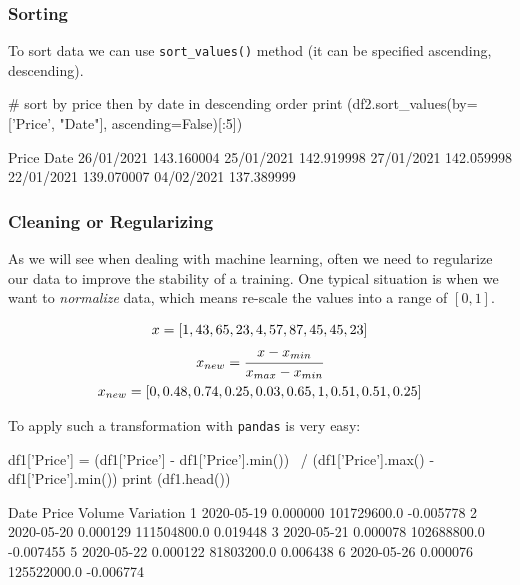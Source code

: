 \subsubsection{Sorting}\label{sorting}

To sort data we can use \texttt{sort\_values()} method (it can be specified ascending, descending).

\begin{ipythonnon}
# sort by price then by date in descending order
print (df2.sort_values(by=['Price', "Date"], ascending=False)[:5])
\end{ipythonnon}
\begin{ioutput}
                 Price
Date                  
26/01/2021  143.160004
25/01/2021  142.919998
27/01/2021  142.059998
22/01/2021  139.070007
04/02/2021  137.389999
\end{ioutput}
        
\subsubsection{Cleaning or Regularizing}
\label{cleaning-or-regularizing}

As we will see when dealing with machine learning, often we need to regularize our data to improve the stability of a training. One typical situation is when we want to \emph{normalize} data, which means re-scale the values into a range of $[0, 1]$.

\begin{equation*}
\begin{gathered}
x = [1,43,65,23,4,57,87,45,45,23]\\
x_{new} = \cfrac{x - x_{min}}{x_{max} - x_{min}}\\
x_{new} = [0,0.48,0.74,0.25,0.03,0.65,1,0.51,0.51,0.25]
\end{gathered}
\end{equation*}

To apply such a transformation with \texttt{pandas} is very easy: 
\begin{ipythonnon}
df1['Price'] = (df1['Price'] - df1['Price'].min()) \
    / (df1['Price'].max() - df1['Price'].min())
print (df1.head())
\end{ipythonnon}
\begin{ioutput}
        Date     Price       Volume  Variation
1 2020-05-19  0.000000  101729600.0  -0.005778
2 2020-05-20  0.000129  111504800.0   0.019448
3 2020-05-21  0.000078  102688800.0  -0.007455
5 2020-05-22  0.000122   81803200.0   0.006438
6 2020-05-26  0.000076  125522000.0  -0.006774
\end{ioutput}
        
